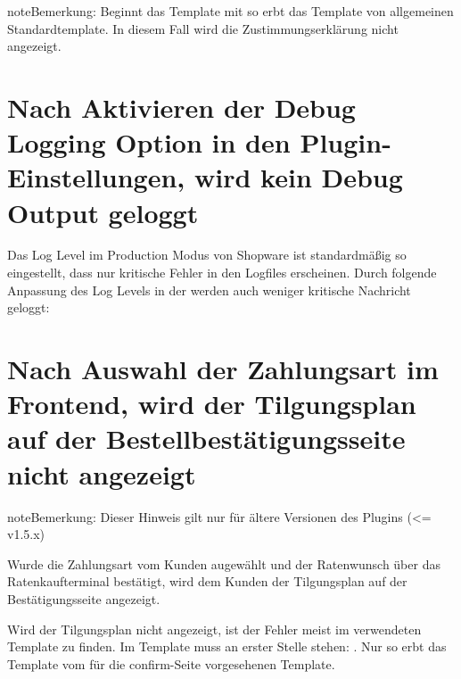 \documentclass[a4paper,10pt,openany,oneside,ngerman]{sphinxmanual}
\begin{document}
\begin{sphinxadmonition}{note}{Bemerkung:}
Beginnt das Template mit  so erbt das Template von allgemeinen Standardtemplate. In diesem Fall wird die Zustimmungserklärung nicht angezeigt.
\end{sphinxadmonition}


\section{Nach Aktivieren der Debug Logging Option in den Plugin-Einstellungen, wird kein Debug Output geloggt}
\label{\detokenize{faq:nach-aktivieren-der-debug-logging-option-in-den-plugin-einstellungen-wird-kein-debug-output-geloggt}}
Das Log Level im Production Modus von Shopware ist standardmäßig so eingestellt, dass nur kritische Fehler in den Logfiles erscheinen.
Durch folgende Anpassung des Log Levels in der  werden auch weniger kritische Nachricht geloggt:

%
\begin{sphinxVerbatim}[commandchars=\\\{\}]
\PYG{x}{\PYGZsq{}logger\PYGZsq{} =\PYGZgt{} [}
\PYG{x}{]}
\end{sphinxVerbatim}


\section{Nach Auswahl der Zahlungsart im Frontend, wird der Tilgungsplan auf der Bestellbestätigungsseite nicht angezeigt}
\label{\detokenize{faq:nach-auswahl-der-zahlungsart-im-frontend-wird-der-tilgungsplan-auf-der-bestellbestatigungsseite-nicht-angezeigt}}
\begin{sphinxadmonition}{note}{Bemerkung:}
Dieser Hinweis gilt nur für ältere Versionen des Plugins (\textless{}= v1.5.x)
\end{sphinxadmonition}

Wurde die Zahlungsart vom Kunden augewählt und der Ratenwunsch über das Ratenkaufterminal bestätigt, wird dem Kunden der Tilgungsplan auf der Bestätigungsseite angezeigt.

Wird der Tilgungsplan nicht angezeigt, ist der Fehler meist im verwendeten Template zu finden. Im Template  muss an erster Stelle stehen: . Nur so erbt das Template vom für die confirm-Seite vorgesehenen Template.
\end{document}
